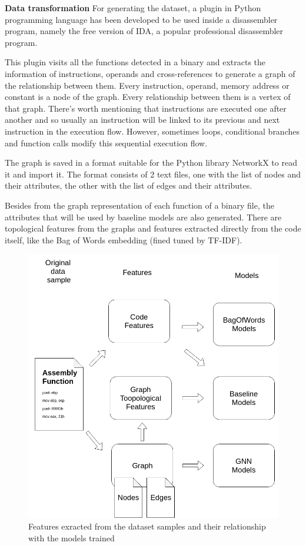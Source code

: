 \textbf{Data transformation}
For generating the dataset, a plugin in Python programming language has been developed to be used inside a disassembler program, namely the free version of IDA, a popular professional disassembler program.


This plugin visits all the functions detected in a binary and extracts the information of instructions, operands and cross-references to generate a graph of the relationship between them. Every instruction, operand, memory address or constant is a node of the graph. Every relationship between them is a vertex of that graph. There's worth mentioning that instructions are executed one after another and so usually an instruction will be linked to its previous and next instruction in the execution flow. However, sometimes loops, conditional branches and function calls modify this sequential execution flow.

The graph is saved in a format suitable for the Python library NetworkX to read it and import it. The format consists of 2 text files, one with the list of nodes and their attributes, the other with the list of edges and their attributes.


Besides from the graph representation of each function of a binary file, the attributes that will be used by baseline models are also generated. There are topological features from the graphs and features extracted directly from the code itself, like the Bag of Words embedding (fined tuned by TF-IDF).




\begin{figure}[H]
    \centering
        \includegraphics[width=0.55\linewidth]{img/Features_and_models_diagram.png}
    \caption{Features exracted from the dataset samples and their relationship with the models trained}\label{fig:Features_diagram}
\end{figure}

